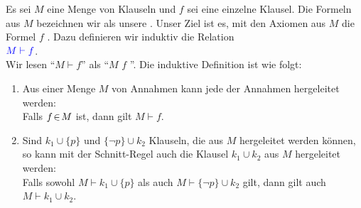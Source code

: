 \begin{Definition}
    Es sei $M$ eine Menge von Klauseln  und $f$ sei eine einzelne Klausel.  
    Die Formeln aus $M$ bezeichnen wir als unsere .  Unser Ziel ist es, mit den Axiomen aus $M$
    die Formel $f$ .  Dazu definieren wir induktiv die Relation \\[0.2cm]
    \hspace*{1.3cm}
    ${\color{blue}M \vdash f}$. \\[0.2cm]
    Wir lesen ``$M \vdash f$'' als ``$M$  $f$ ''.  Die induktive Definition ist
    wie folgt:
    \begin{enumerate}
    \item Aus einer Menge $M$ von Annahmen kann jede der Annahmen hergeleitet werden: \\[0.2cm]
          \hspace*{1.3cm} 
          Falls $f \!\in\! M$ ist, dann gilt  $M \vdash f$.
    \item Sind $k_1 \cup \{p\}$ und $\{ \neg p \} \cup k_2$ Klauseln, die aus $M$
          hergeleitet werden können, so kann mit der Schnitt-Regel auch die Klausel $k_1 \cup k_2$ aus $M$
          hergeleitet werden: \\[0.2cm]
          \hspace*{1.3cm} 
          Falls sowohl $M \vdash k_1 \cup \{p\}$ als auch $M \vdash \{ \neg p \} \cup k_2$
          gilt, dann gilt auch $M \vdash k_1 \cup k_2$.
    \eox
    \end{enumerate}
\end{Definition}




